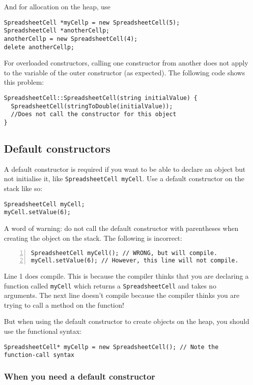 \documentclass[a4paper,12pt]{article}
\begin{document}
And for allocation on the heap, use
\begin{lstlisting}
SpreadsheetCell *myCellp = new SpreadsheetCell(5);
SpreadsheetCell *anotherCellp;
anotherCellp = new SpreadsheetCell(4);
delete anotherCellp;
\end{lstlisting}

For overloaded constructors, calling one constructor from another does not apply to the variable of the outer constructor (as expected). The following code shows this problem:

\begin{lstlisting}
SpreadsheetCell::SpreadsheetCell(string initialValue) {
  SpreadsheetCell(stringToDouble(initialValue));
  //Does not call the constructor for this object
}
\end{lstlisting}

\subsection{Default constructors}
A default constructor is required if you want to be able to declare an object but not initialise it, like \lstinline|SpreadsheetCell myCell|. Use a default constructor on the stack like so:

\begin{lstlisting}
SpreadsheetCell myCell;
myCell.setValue(6);
\end{lstlisting}

A word of warning: do not call the default constructor with parentheses when creating the object on the stack. The following is incorrect:

\begin{lstlisting}[numbers=left]
SpreadsheetCell myCell(); // WRONG, but will compile.
myCell.setValue(6); // However, this line will not compile.
\end{lstlisting}

Line 1 does compile. This is because the compiler thinks that you are declaring a function called \lstinline|myCell| which returns a \lstinline|SpreadsheetCell| and takes no arguments. The next line doesn't compile because the compiler thinks you are trying to call a method on the function!

\noindent{}

But when using the default constructor to create objects on the heap, you should use the functional syntax:

\begin{lstlisting}
SpreadsheetCell* myCellp = new SpreadsheetCell(); // Note the function-call syntax
\end{lstlisting}

\subsubsection{When you need a default constructor}
\end{document}
